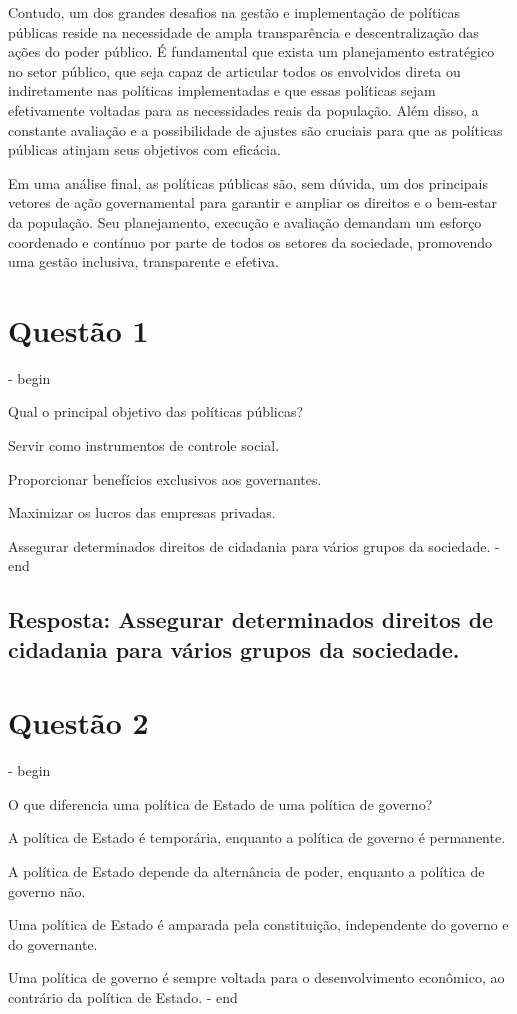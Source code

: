 \documentclass[
   article,       
   12pt,          
   oneside,       
   a4paper,       
   english,       
   brazil,        
   sumario=tradicional
   ]{abntex2}
\begin{document}
Contudo, um dos grandes desafios na gestão e implementação de políticas públicas reside na necessidade de ampla transparência e descentralização das ações do poder público. É fundamental que exista um planejamento estratégico no setor público, que seja capaz de articular todos os envolvidos direta ou indiretamente nas políticas implementadas e que essas políticas sejam efetivamente voltadas para as necessidades reais da população. Além disso, a constante avaliação e a possibilidade de ajustes são cruciais para que as políticas públicas atinjam seus objetivos com eficácia.

Em uma análise final, as políticas públicas são, sem dúvida, um dos principais vetores de ação governamental para garantir e ampliar os direitos e o bem-estar da população. Seu planejamento, execução e avaliação demandam um esforço coordenado e contínuo por parte de todos os setores da sociedade, promovendo uma gestão inclusiva, transparente e efetiva.
\section{Questão 1}
\itemize - begin
\item Qual o principal objetivo das políticas públicas?
\item Servir como instrumentos de controle social.
\item Proporcionar benefícios exclusivos aos governantes.
\item Maximizar os lucros das empresas privadas.
\item Assegurar determinados direitos de cidadania para vários grupos da sociedade.
\itemize - end
\subsection{Resposta: Assegurar determinados direitos de cidadania para vários grupos da sociedade.}

\section{Questão 2}
\itemize - begin
\item O que diferencia uma política de Estado de uma política de governo?
\item A política de Estado é temporária, enquanto a política de governo é permanente.
\item A política de Estado depende da alternância de poder, enquanto a política de governo não.
\item Uma política de Estado é amparada pela constituição, independente do governo e do governante.
\item Uma política de governo é sempre voltada para o desenvolvimento econômico, ao contrário da política de Estado.
\itemize - end
\end{document}
